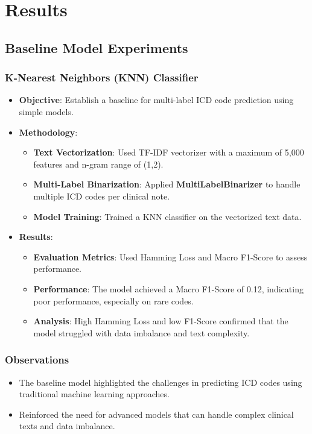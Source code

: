 \documentclass[12pt,a4paper]{report}
\begin{document}
\chapter{Results}

\section{Baseline Model Experiments}

\subsection{K-Nearest Neighbors (KNN) Classifier}
\begin{itemize}
    \item \textbf{Objective}: Establish a baseline for multi-label ICD code prediction using simple models.
    \item \textbf{Methodology}:
    \begin{itemize}
        \item \textbf{Text Vectorization}: Used TF-IDF vectorizer with a maximum of 5,000 features and n-gram range of (1,2).
        \item \textbf{Multi-Label Binarization}: Applied \textbf{MultiLabelBinarizer} to handle multiple ICD codes per clinical note.
        \item \textbf{Model Training}: Trained a KNN classifier on the vectorized text data.
    \end{itemize}
    \item \textbf{Results}:
    \begin{itemize}
        \item \textbf{Evaluation Metrics}: Used Hamming Loss and Macro F1-Score to assess performance.
        \item \textbf{Performance}: The model achieved a Macro F1-Score of 0.12, indicating poor performance, especially on rare codes.
        \item \textbf{Analysis}: High Hamming Loss and low F1-Score confirmed that the model struggled with data imbalance and text complexity.
    \end{itemize}
\end{itemize}

\subsection{Observations}
\begin{itemize}
    \item The baseline model highlighted the challenges in predicting ICD codes using traditional machine learning approaches.
    \item Reinforced the need for advanced models that can handle complex clinical texts and data imbalance.
\end{itemize}
\end{document}
